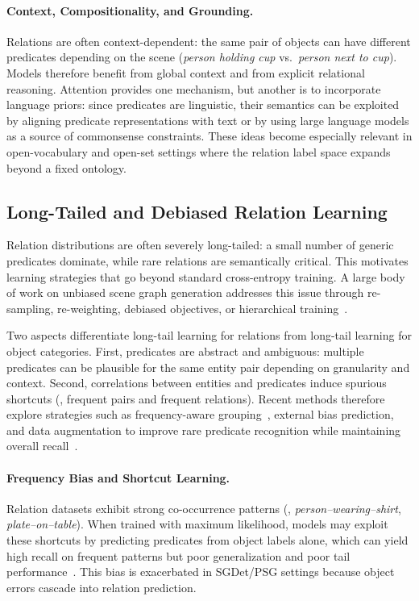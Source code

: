 \paragraph{Context, Compositionality, and Grounding.}
Relations are often context-dependent: the same pair of objects can have different predicates depending on the scene (\emph{person holding cup} vs.\ \emph{person next to cup}). Models therefore benefit from global context and from explicit relational reasoning. Attention provides one mechanism, but another is to incorporate language priors: since predicates are linguistic, their semantics can be exploited by aligning predicate representations with text or by using large language models as a source of commonsense constraints. These ideas become especially relevant in open-vocabulary and open-set settings where the relation label space expands beyond a fixed ontology.

\subsection{Long-Tailed and Debiased Relation Learning}
Relation distributions are often severely long-tailed: a small number of generic predicates dominate, while rare relations are semantically critical. This motivates learning strategies that go beyond standard cross-entropy training. A large body of work on unbiased scene graph generation addresses this issue through re-sampling, re-weighting, debiased objectives, or hierarchical training~\citep{tang2020unbiased, li2021bipartite, yu2020cogtree, deng2022hierarchical, kang2023skew}.

Two aspects differentiate long-tail learning for relations from long-tail learning for object categories. First, predicates are abstract and ambiguous: multiple predicates can be plausible for the same entity pair depending on granularity and context. Second, correlations between entities and predicates induce spurious shortcuts (\eg, frequent pairs and frequent relations). Recent methods therefore explore strategies such as frequency-aware grouping~\citep{dong2022stacked}, external bias prediction, and data augmentation to improve rare predicate recognition while maintaining overall recall~\citep{zhang2022fine}.

\paragraph{Frequency Bias and Shortcut Learning.}
Relation datasets exhibit strong co-occurrence patterns (\eg, \emph{person--wearing--shirt}, \emph{plate--on--table}). When trained with maximum likelihood, models may exploit these shortcuts by predicting predicates from object labels alone, which can yield high recall on frequent patterns but poor generalization and poor tail performance~\citep{zellers2018neural}. This bias is exacerbated in SGDet/PSG settings because object errors cascade into relation prediction.

